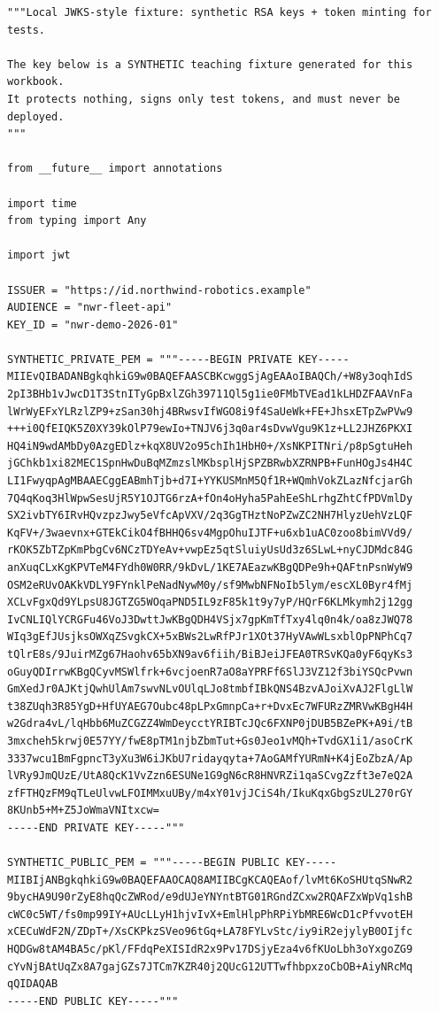 \begin{verbatim}
"""Local JWKS-style fixture: synthetic RSA keys + token minting for tests.

The key below is a SYNTHETIC teaching fixture generated for this workbook.
It protects nothing, signs only test tokens, and must never be deployed.
"""

from __future__ import annotations

import time
from typing import Any

import jwt

ISSUER = "https://id.northwind-robotics.example"
AUDIENCE = "nwr-fleet-api"
KEY_ID = "nwr-demo-2026-01"

SYNTHETIC_PRIVATE_PEM = """-----BEGIN PRIVATE KEY-----
MIIEvQIBADANBgkqhkiG9w0BAQEFAASCBKcwggSjAgEAAoIBAQCh/+W8y3oqhIdS
2pI3BHb1vJwcD1T3StnITyGpBxlZGh39711Ql5g1ie0FMbTVEad1kLHDZFAAVnFa
lWrWyEFxYLRzlZP9+zSan30hj4BRwsvIfWGO8i9f4SaUeWk+FE+JhsxETpZwPVw9
+++i0QfEIQK5Z0XY39kOlP79ewIo+TNJV6j3q0ar4sDvwVgu9K1z+LL2JHZ6PKXI
HQ4iN9wdAMbDy0AzgEDlz+kqX8UV2o95chIh1HbH0+/XsNKPITNri/p8pSgtuHeh
jGChkb1xi82MEC1SpnHwDuBqMZmzslMKbsplHjSPZBRwbXZRNPB+FunHOgJs4H4C
LI1FwyqpAgMBAAECggEABmhTjb+d7I+YYKUSMnM5Qf1R+WQmhVokZLazNfcjarGh
7Q4qKoq3HlWpwSesUjR5Y1OJTG6rzA+fOn4oHyha5PahEeShLrhgZhtCfPDVmlDy
SX2ivbTY6IRvHQvzpzJwy5eVfcApVXV/2q3GgTHztNoPZwZC2NH7HlyzUehVzLQF
KqFV+/3waevnx+GTEkCikO4fBHHQ6sv4MgpOhuIJTF+u6xb1uAC0zoo8bimVVd9/
rKOK5ZbTZpKmPbgCv6NCzTDYeAv+vwpEz5qtSluiyUsUd3z6SLwL+nyCJDMdc84G
anXuqCLxKgKPVTeM4FYdh0W0RR/9kDvL/1KE7AEazwKBgQDPe9h+QAFtnPsnWyW9
OSM2eRUvOAKkVDLY9FYnklPeNadNywM0y/sf9MwbNFNoIb5lym/escXL0Byr4fMj
XCLvFgxQd9YLpsU8JGTZG5WOqaPND5IL9zF85k1t9y7yP/HQrF6KLMkymh2j12gg
IvCNLIQlYCRGFu46VoJ3DwttJwKBgQDH4VSjx7gpKmTfTxy4lq0n4k/oa8zJWQ78
WIq3gEfJUsjksOWXqZSvgkCX+5xBWs2LwRfPJr1XOt37HyVAwWLsxblOpPNPhCq7
tQlrE8s/9JuirMZg67Haohv65bXN9av6fiih/BiBJeiJFEA0TRSvKQa0yF6qyKs3
oGuyQDIrrwKBgQCyvMSWlfrk+6vcjoenR7aO8aYPRFf6SlJ3VZ12f3biYSQcPvwn
GmXedJr0AJKtjQwhUlAm7swvNLvOUlqLJo8tmbfIBkQNS4BzvAJoiXvAJ2FlgLlW
t38ZUqh3R85YgD+HfUYAEG7Oubc48pLPxGmnpCa+r+DvxEc7WFURzZMRVwKBgH4H
w2Gdra4vL/lqHbb6MuZCGZZ4WmDeycctYRIBTcJQc6FXNP0jDUB5BZePK+A9i/tB
3mxcheh5krwj0E57YY/fwE8pTM1njbZbmTut+Gs0Jeo1vMQh+TvdGX1i1/asoCrK
3337wcu1BmFgpncT3yXu3W6iJKbU7ridayqyta+7AoGAMfYURmN+K4jEoZbzA/Ap
lVRy9JmQUzE/UtA8QcK1VvZzn6ESUNe1G9gN6cR8HNVRZi1qaSCvgZzft3e7eQ2A
zfFTHQzFM9qTLeUlvwLFOIMMxuUBy/m4xY01vjJCiS4h/IkuKqxGbgSzUL270rGY
8KUnb5+M+Z5JoWmaVNItxcw=
-----END PRIVATE KEY-----"""

SYNTHETIC_PUBLIC_PEM = """-----BEGIN PUBLIC KEY-----
MIIBIjANBgkqhkiG9w0BAQEFAAOCAQ8AMIIBCgKCAQEAof/lvMt6KoSHUtqSNwR2
9bycHA9U90rZyE8hqQcZWRod/e9dUJeYNYntBTG01RGndZCxw2RQAFZxWpVq1shB
cWC0c5WT/fs0mp99IY+AUcLLyH1hjvIvX+EmlHlpPhRPiYbMRE6WcD1cPfvvotEH
xCECuWdF2N/ZDpT+/XsCKPkzSVeo96tGq+LA78FYLvStc/iy9iR2ejylyB0OIjfc
HQDGw8tAM4BA5c/pKl/FFdqPeXISIdR2x9Pv17DSjyEza4v6fKUoLbh3oYxgoZG9
cYvNjBAtUqZx8A7gajGZs7JTCm7KZR40j2QUcG12UTTwfhbpxzoCbOB+AiyNRcMq
qQIDAQAB
-----END PUBLIC KEY-----"""


\end{verbatim}
